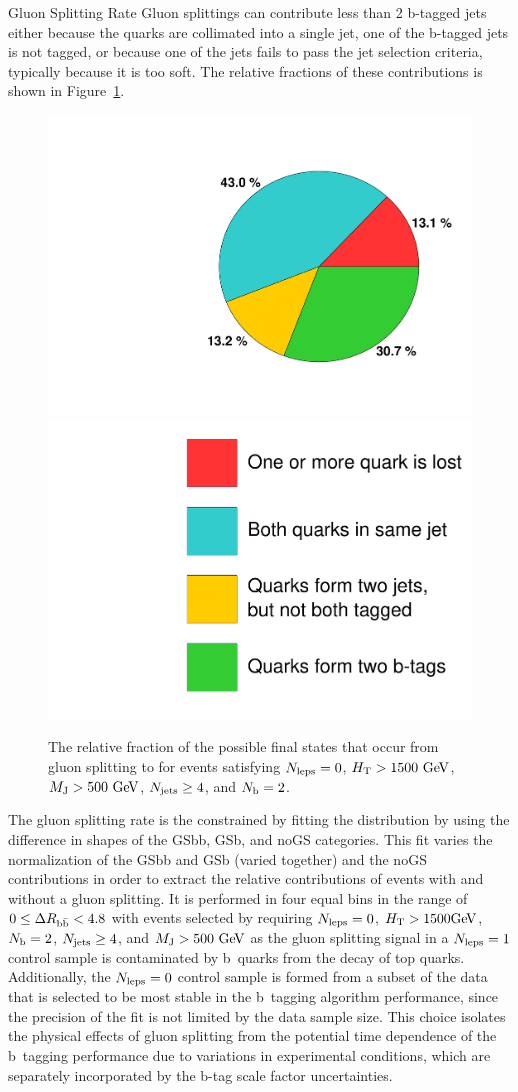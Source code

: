 \begin{section}{Gluon Splitting Rate}
Gluon splittings can contribute less than 2 b-tagged jets either because the quarks are collimated into a single jet, one of the b-tagged jets is not tagged, or because one of the jets fails to pass the jet selection criteria, typically because it is too soft.
The relative fractions of these contributions is shown in Figure~\ref{fig:gs_categories}.

\begin{figure}[tbp!]
\begin{center}
\includegraphics[angle=0,width=0.45\columnwidth]{fig/gs_piechart.pdf}
\includegraphics[angle=0,width=0.45\columnwidth]{fig/gs_piechart_legend.pdf}
\end{center}
\caption{The relative fraction of the possible final states that occur from gluon splitting to \bbbar for events satisfying $N_{\mathrm{leps}} = 0$, $H_{\mathrm{T}} > 1500~\mathrm{Ge\kern -0.1em V}$, $M_{\mathrm{J}} > 500~\mathrm{Ge\kern -0.1em V}$, $N_{\mathrm{jets}} \geq 4$, and $N_{\mathrm{b}} = 2$.}
\label{fig:gs_categories}
\end{figure}

The gluon splitting rate is the constrained by fitting the \dRbb distribution by using the difference in shapes of the GSbb, GSb, and noGS categories.
This fit varies the normalization of the GSbb and GSb (varied together) and the noGS contributions in order to extract the relative contributions of events with and without a gluon splitting.
It is performed in four equal bins in the range of $0 \leq \Delta R_{\mathrm{b\bar{b}}} < 4.8$ with events selected by requiring $N_{\mathrm{leps}} = 0$, $H_{\mathrm{T}} > 1500\mathrm{Ge\kern -0.1em V}$, $N_{\mathrm{b}} = 2$, $N_{\mathrm{jets}} \geq 4$, and $M_{\mathrm{J}} > 500~\mathrm{Ge\kern -0.1em V}$ as the gluon splitting signal in a $N_{\mathrm{leps}} = 1$ control sample is contaminated by b~quarks from the decay of top quarks.
Additionally, the $N_{\mathrm{leps}} = 0$ control sample is formed from a subset of the data that is selected to be most stable in the b~tagging algorithm performance, since the precision of the \dRbb fit is not limited by the data sample size.
This choice isolates the physical effects of gluon splitting from the potential time dependence of the b~tagging performance due to variations in experimental conditions, which are separately incorporated by the b-tag scale factor uncertainties.


\end{section}
